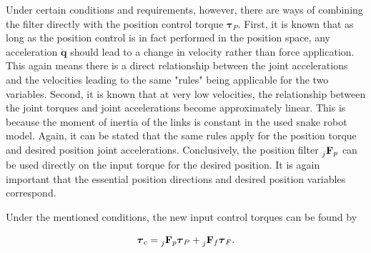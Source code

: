 Under certain conditions and requirements, however, there are ways of combining the filter directly with the position control torque $\boldsymbol{\tau}_P$. First, it is known that as long as the position control is in fact performed in the position space, any acceleration $\ddot{\mathbf{q}}$ should lead to a change in velocity rather than force application. This again means there is a direct relationship between the joint accelerations and the velocities leading to the same "rules" being applicable for the two variables. Second, it is known that at very low velocities, the relationship between the joint torques and joint accelerations become approximately linear. This is because the moment of inertia of the links is constant in the used snake robot model. Again, it can be stated that the same rules apply for the position torque and desired position joint accelerations. Conclusively, the position filter $\prescript{}{j}{\mathbf{F}}_{p}$ can be used directly on the input torque for the desired position. It is again important that the essential position directions and desired position variables correspond.

Under the mentioned conditions, the new input control torques can be found by

\begin{equation}
    \boldsymbol{\tau}_c = \prescript{}{j}{\mathbf{F}}_{p} \boldsymbol{\tau}_P + \prescript{}{j}{\mathbf{F}}_{f} \boldsymbol{\tau}_F.
\end{equation}
